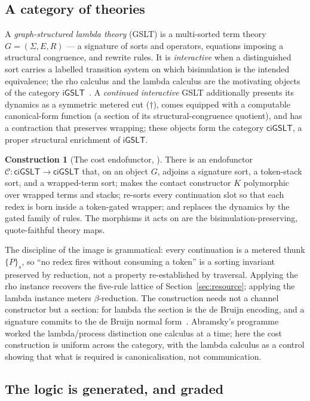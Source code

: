 \documentclass[11pt]{article}
\theoremstyle{definition}
\newtheorem{construction}[definition]{Construction}
\theoremstyle{plain}
\newcommand{\C}{\mathcal{C}}
\newcommand{\ciGSLT}{\mathsf{ciGSLT}}
\newcommand{\iGSLT}{\mathsf{iGSLT}}
\begin{document}
\subsection{A category of theories}

A \emph{graph-structured lambda theory} (GSLT) is a multi-sorted term theory
$G = (\Sigma, E, R)$ --- a signature of sorts and operators, equations imposing a
structural congruence, and rewrite rules. It is \emph{interactive} when a
distinguished sort carries a labelled transition system on which bisimulation is
the intended equivalence; the rho calculus and the lambda calculus are the
motivating objects of the category $\iGSLT$~\cite{NoteII}. A \emph{continued
interactive} GSLT additionally presents its dynamics as a symmetric metered cut
($\dagger$), comes equipped with a computable canonical-form function (a section
of its structural-congruence quotient), and has a contraction that preserves
wrapping; these objects form the category $\ciGSLT$, a proper structural
enrichment of $\iGSLT$.

\begin{construction}[The cost endofunctor, {\cite{NoteII}}]
There is an endofunctor $\C : \ciGSLT \to \ciGSLT$ that, on an object $G$,
adjoins a signature sort, a token-stack sort, and a wrapped-term sort; makes the
contact constructor $K$ polymorphic over wrapped terms and stacks; re-sorts every
continuation slot so that each redex is born inside a token-gated wrapper; and
replaces the dynamics by the gated family of rules. The morphisms it acts on are
the bisimulation-preserving, quote-faithful theory maps.
\end{construction}

The discipline of the image is grammatical: every continuation is a metered
thunk $\{P\}_s$, so ``no redex fires without consuming a token'' is a sorting
invariant preserved by reduction, not a property re-established by traversal.
Applying the rho instance recovers the five-rule lattice of
Section~\ref{sec:resource}; applying the lambda instance meters
$\beta$-reduction. The construction needs not a channel constructor but a
section: for lambda the section is the de Bruijn encoding, and a signature
commits to the de Bruijn normal form~\cite{NoteII}. Abramsky's programme worked
the lambda/process distinction one calculus at a time; here the cost
construction is uniform across the category, with the lambda calculus as a
control showing that what is required is canonicalisation, not communication.

\subsection{The logic is generated, and graded}
\end{document}
